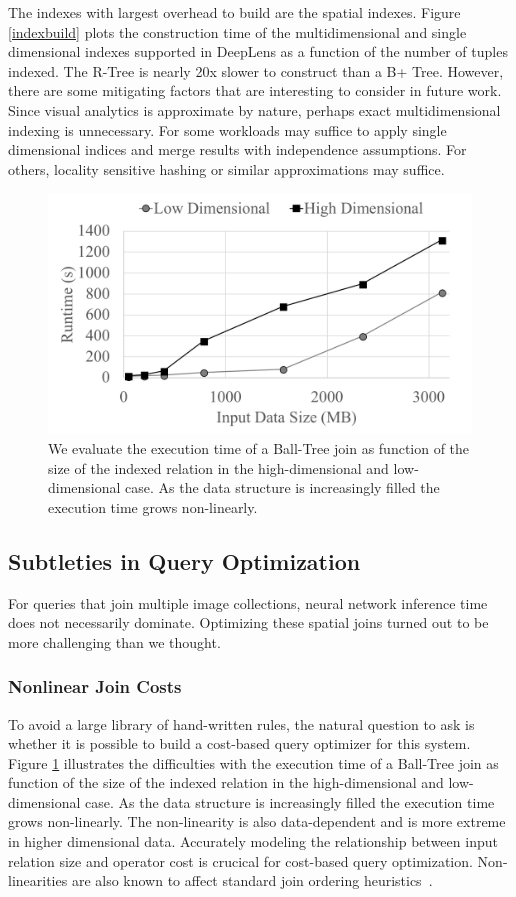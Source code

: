 The indexes with largest overhead to build are the spatial indexes.
Figure \ref{indexbuild} plots the construction time of the multidimensional and single dimensional indexes supported in \textsf{DeepLens} as a function of the number of tuples indexed.
The R-Tree is nearly 20x slower to construct than a B+ Tree.
However, there are some mitigating factors that are interesting to consider in future work.
Since visual analytics is approximate by nature, perhaps exact multidimensional indexing is unnecessary. 
For some workloads may suffice to apply single dimensional indices and merge results with independence assumptions.
For others, locality sensitive hashing or similar approximations may suffice.

\begin{figure}[t]
\centering
 \includegraphics[width=0.8\columnwidth]{figures/spatialjoin.png}
 \caption{We evaluate the execution time of a Ball-Tree join as function of the size of the indexed relation in the high-dimensional and low-dimensional case. As the data structure is increasingly filled the execution time grows non-linearly. \label{join} }
\end{figure}


\subsection{Subtleties in Query Optimization}
For queries that join multiple image collections, neural network inference time does not necessarily dominate.
Optimizing these spatial joins turned out to be more challenging than we thought.

\subsubsection{Nonlinear Join Costs}
To avoid a large library of hand-written rules, the natural question to ask is whether it is possible to build a cost-based query optimizer for this system.
Figure \ref{join} illustrates the difficulties with the execution time of a Ball-Tree join as function of the size of the indexed relation in the high-dimensional and low-dimensional case. As the data structure is increasingly filled the execution time grows non-linearly. The non-linearity is also data-dependent and is more extreme in higher dimensional data. Accurately modeling the relationship between input relation size and operator cost is crucical for cost-based query optimization. Non-linearities are also known to affect standard join ordering heuristics~\cite{krishnan2018deeprljoins}.


